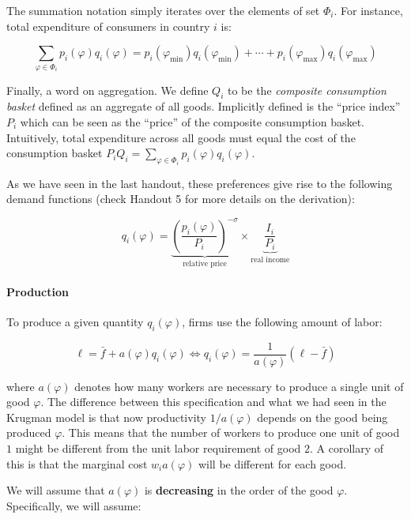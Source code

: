 \documentclass[11pt,letterpaper]{article}
\begin{document}
The summation notation simply iterates over the elements of set $\Phi_i$. For instance,  total expenditure of consumers in country $i$ is:

\begin{equation*}
    \sum_{\varphi \in \Phi_i } p_i(\varphi) q_i(\varphi) = p_i(\varphi_{\min}) q_i(\varphi_{\min}) +\cdots + p_i(\varphi_{\max}) q_i(\varphi_{\max})
\end{equation*}

Finally, a word on aggregation. We define $ Q_i$ to be the \textit{composite consumption basket}
defined as an aggregate of all goods. Implicitly defined is the ``price index'' $P_i$ which can be seen as the ``price'' of the composite consumption basket. Intuitively, total expenditure across all goods must equal the cost of the consumption basket $P_i Q_i =\sum_{\varphi \in \Phi_i } p_i(\varphi) q_i(\varphi)$.

As we have seen in the last handout, these preferences give rise to the following demand functions (check Handout 5 for more details on the derivation):

\begin{equation*}
\boxed{
    q_i(\varphi) = \underbrace{\left( \frac{p_i(\varphi)}{P_i} \right)^{-\sigma}}_{\text{relative price}} \times \underbrace{\frac{I_i}{P_i}}_{\text{real income}}}
\end{equation*}

\paragraph{Production} To produce a given quantity $q_i(\varphi)$, firms use the following amount of labor:

\begin{equation*}
     \ell = \bar{f} + a(\varphi)q_i(\varphi) \iff q_i(\varphi) = \frac{1}{a(\varphi)} (\ell - \bar{f})
\end{equation*}

where $a(\varphi)$ denotes how many workers are necessary to produce a single unit of good $\varphi$. The difference between this specification and what we had seen in the Krugman model is that now productivity $1/a(\varphi)$ depends on the good being produced $\varphi$. This means that the number of workers to produce one unit of good $1$ might be different from the unit labor requirement of good $2$. A corollary of this is that the marginal cost $w_i a(\varphi)$ will be different for each good.

We will assume that $a(\varphi)$ is \textbf{decreasing} in the order of the good $\varphi$. Specifically, we will assume:
\end{document}
